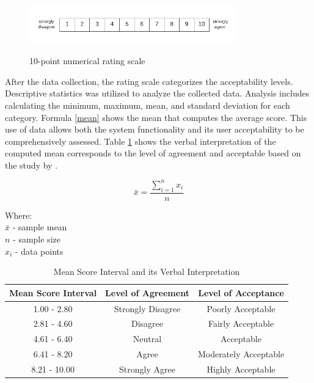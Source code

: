 	\begin{figure}[h!]
		\caption{10-point numerical rating scale}
		\centering
		\includegraphics[width=3.5in]{Nrs-10}
		\label{Nrs}
	\end{figure}
	
	After the data collection, the rating scale categorizes the acceptability levels. Descriptive statistics was utilized to analyze the collected data. Analysis includes calculating the minimum, maximum, mean, and standard deviation for each category. Formula \ref{mean} shows the mean that computes the average score. This use of data allows both the system functionality and its user acceptability to be comprehensively assessed. Table \ref{Verbal} shows the verbal interpretation of the computed mean corresponds to the level of agreement and acceptable based on the study by \textcite{Eladia2024}. 
	
	
	\begin{equation} 
		\label{mean}
		\bar{x} = \frac{\sum_{i=1}^{n} x_{i}}{n}
	\end{equation}
	
	\noindent Where:
	\\$\bar{x}$ - sample mean
	\\$n$ - sample size
	\\$x_{i}$ - data points
	
	\begin{table}[h]
		\centering
		\caption{Mean Score Interval and its Verbal Interpretation}
		\label{Verbal}
			\begin{tabular}{|c|c|c|}
				\hline
				\multicolumn{1}{|c|}{\textbf{Mean Score Interval}} & 
				\multicolumn{1}{c|}{\textbf{Level of Agreement}} & 
				\multicolumn{1}{c|}{\textbf{Level of Acceptance}} \\ \hline
				1.00 - 2.80   & Strongly Disagree   & Poorly Acceptable            \\ \hline
				2.81 - 4.60               & Disagree   & Fairly Acceptable  \\ \hline
				4.61 - 6.40           & Neutral   & Acceptable \\ \hline
				6.41 - 8.20            & Agree   & Moderately Acceptable      \\ \hline
				8.21 - 10.00               & Strongly Agree      & Highly Acceptable\\ \hline
			\end{tabular}
	\end{table}
	
